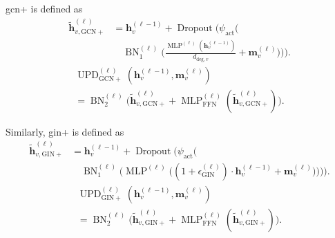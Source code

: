 \gls{gcn}+ is defined as
\begin{equation}
\label{eq:ch07:gcn-plus-propagation}
\begin{split}
    \widetilde{\mathbf h}_{v,\mathrm{GCN+}}^{(\ell)}
        &=\mathbf{h}_v^{(\ell-1)}+\operatorname{Dropout}\bigl(\psi_{\mathrm{act}}\bigl(\\
        &\quad\operatorname{BN}_1^{(\ell)}\bigl(\tfrac{\operatorname{MLP}^{(\ell)}(\mathbf{h}_v^{(\ell-1)})}{d_{\mathrm{deg},v}}+\mathbf{m}_v^{(\ell)}\bigr)\bigr)\bigr).
\end{split}
\end{equation}
\begin{equation}
\label{eq:ch07:gcn-plus-update}
\begin{gathered}
    \operatorname{UPD}_{\mathrm{GCN+}}^{(\ell)}\!\left(\mathbf{h}_v^{(\ell-1)},\mathbf{m}_v^{(\ell)}\right)\\
        =\operatorname{BN}_2^{(\ell)}\bigl(\widetilde{\mathbf h}_{v,\mathrm{GCN+}}^{(\ell)}+\operatorname{MLP}_{\mathrm{FFN}}^{(\ell)}(\widetilde{\mathbf h}_{v,\mathrm{GCN+}}^{(\ell)})\bigr).
\end{gathered}
\end{equation}


Similarly, \gls{gin}+ is defined as
\begin{equation}
\label{eq:ch07:gin-plus-propagation}
\begin{split}
    \widetilde{\mathbf h}_{v,\mathrm{GIN+}}^{(\ell)}
        &=\mathbf{h}_v^{(\ell-1)}+\operatorname{Dropout}\bigl(\psi_{\mathrm{act}}\bigl(\\
        &\quad\operatorname{BN}_1^{(\ell)}\bigl(\operatorname{MLP}^{(\ell)}\bigl((1+\epsilon_{\mathrm{GIN}}^{(\ell)})\cdot \mathbf{h}_v^{(\ell-1)}+\mathbf{m}_v^{(\ell)}\bigr)\bigr)\bigr)\bigr).
\end{split}
\end{equation}
\begin{equation}
\label{eq:ch07:gin-plus-update}
\begin{gathered}
    \operatorname{UPD}_{\mathrm{GIN+}}^{(\ell)}\!\left(\mathbf{h}_v^{(\ell-1)},\mathbf{m}_v^{(\ell)}\right)\\
        =\operatorname{BN}_2^{(\ell)}\bigl(\widetilde{\mathbf h}_{v,\mathrm{GIN+}}^{(\ell)}+\operatorname{MLP}_{\mathrm{FFN}}^{(\ell)}(\widetilde{\mathbf h}_{v,\mathrm{GIN+}}^{(\ell)})\bigr).
\end{gathered}
\end{equation}

